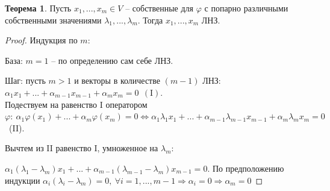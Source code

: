 \documentclass[a4paper, 12pt]{article}
\theoremstyle{definition}
\newtheorem*{theorem}{Теорема}
\begin{document}
    \begin{theorem}
        Пусть $x_1,...,x_m \in V$ -- собственные для $\varphi$
        с попарно различными собственными значениями $\lambda_1,
        ..., \lambda_m$. Тогда $x_1,...,x_m$ ЛНЗ. 
    \end{theorem}
    \begin{proof}
        Индукция по $m$:
        
        База: $m=1$ -- по определению сам себе ЛНЗ.
        
        Шаг: пусть $m > 1$ и векторы в количестве $(m-1)$ ЛНЗ:\\
        $\alpha_1x_1 +...+ \alpha_{m-1}x_{m-1} + \alpha_m
        x_m = 0\ \ (\text{I}).$\\ Подествуем на равенство I оператором
        $\varphi:\ \alpha_1\varphi(x_1) +...+ \alpha_m \varphi(x_m) = 0
        \Longleftrightarrow \alpha_1 \lambda_1x_1 +...+
        \alpha_{m-1}\lambda_{m-1}x_{m-1} +
        \alpha_m \lambda_m x_m = 0$\ (II).
        
        Вычтем из II равенство I, умноженное на $\lambda_m:$
        
        $\alpha_1(\lambda_1 - \lambda_m)x_1 +...+ \alpha_{m-1}
        (\lambda_{m-1} - \lambda_m)x_{m-1} = 0$. По предположению
        индукции $\alpha_i(\lambda_i - \lambda_m) = 0,\ 
        \forall i =1,...,m-1 \Longrightarrow \alpha_i = 0
        \Longrightarrow \alpha_m = 0$
        
    \end{proof}
\end{document}
